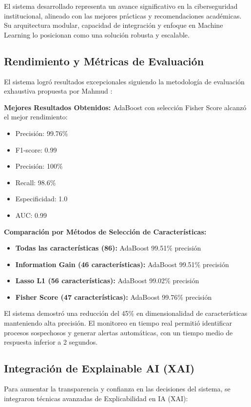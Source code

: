 \documentclass[conference]{IEEEtran}
\begin{document}
El sistema desarrollado representa un avance significativo en la ciberseguridad institucional, alineado con las mejores prácticas y recomendaciones académicas. Su arquitectura modular, capacidad de integración y enfoque en Machine Learning lo posicionan como una solución robusta y escalable.

\subsection{Rendimiento y Métricas de Evaluación}
El sistema logró resultados excepcionales siguiendo la metodología de evaluación exhaustiva propuesta por Mahmud \cite{mahmud2025trustworthy}:

\textbf{Mejores Resultados Obtenidos:}
AdaBoost con selección Fisher Score alcanzó el mejor rendimiento:
\begin{itemize}
    \item Precisión: 99.76\%
    \item F1-score: 0.99
    \item Precisión: 100\%
    \item Recall: 98.6\%
    \item Especificidad: 1.0
    \item AUC: 0.99
\end{itemize}

\textbf{Comparación por Métodos de Selección de Características:}
\begin{itemize}
    \item \textbf{Todas las características (86):} AdaBoost 99.51\% precisión
    \item \textbf{Information Gain (46 características):} AdaBoost 99.51\% precisión
    \item \textbf{Lasso L1 (56 características):} AdaBoost 99.02\% precisión
    \item \textbf{Fisher Score (47 características):} AdaBoost 99.76\% precisión
\end{itemize}

El sistema demostró una reducción del 45\% en dimensionalidad de características manteniendo alta precisión. El monitoreo en tiempo real permitió identificar procesos sospechosos y generar alertas automáticas, con un tiempo medio de respuesta inferior a 2 segundos.

\subsection{Integración de Explainable AI (XAI)}
Para aumentar la transparencia y confianza en las decisiones del sistema, se integraron técnicas avanzadas de Explicabilidad en IA (XAI):
\end{document}
